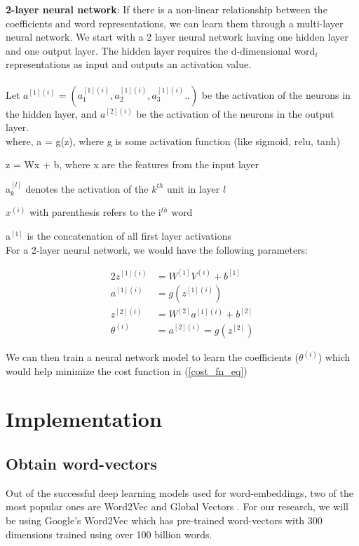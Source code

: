 \noindent\textbf{2-layer neural network}: If there is a non-linear relationship between the coefficients and word representations, we can learn them through a multi-layer neural network. We start with a 2 layer neural network having one hidden layer and one output layer. The hidden layer requires the d-dimensional word$_{i}$ representations as input and outputs an activation value.\\\\ Let $a^{[1](i)} = (a^{[1](i)}_{1},a^{[1](i)}_{2},a^{[1](i)}_{3}..)$ be the activation of the neurons in the hidden layer, and $a^{[2](i)}$ be the activation of the neurons in the output layer.\\

\noindent where, a = g(z), where g is some activation function (like sigmoid, relu, tanh)

\quad\quad z = Wx + b, where x are the features from the input layer

\quad\quad a$^{[l]}_{k}$ denotes the activation of the $k^{th}$ unit in layer $l$

\quad\quad $x^{(i)}$ with parenthesis refers to the i$^{th}$ word

\quad\quad a$^{[1]}$ is the concatenation of all first layer activations\\

\noindent For a 2-layer neural network, we would have the following parameters:

\begin{alignat}{2}
z^{[1](i)} & = W^{[1]}V^{(i)} + b^{[1]}\\
a^{[1](i)} & = g(z^{[1](i)})\\
z^{[2](i)} & = W^{[2]}a^{[1](i)} + b^{[2]}\\
\theta^{(i)} & = a^{[2](i)} = g(z^{[2]})
\end{alignat}

\noindent We can then train a neural network model to learn the coefficients ($\theta^{(i)}$) which would help minimize the cost function in (\ref{cost_fn_eq})

\section{Implementation}

\subsection{Obtain word-vectors}

Out of the successful deep learning models used for word-embeddings, two of the most popular ones are Word2Vec \cite{le2014distributed} and Global Vectors \cite{pennington2014glove}. For our research, we will be using Google's Word2Vec which has pre-trained word-vectors with 300 dimensions trained using over 100 billion words. 

